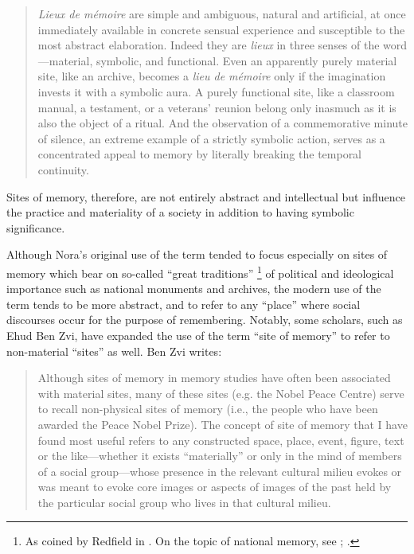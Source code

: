 \begin{quote}
    \emph{Lieux de mémoire} are simple and ambiguous, natural and artificial, at once immediately available in concrete sensual experience and susceptible to the most abstract elaboration. Indeed they are \emph{lieux} in three senses of the word---material, symbolic, and functional. Even an apparently purely material site, like an archive, becomes a \emph{lieu de mémoire} only if the imagination invests it with a symbolic aura. A purely functional site, like a classroom manual, a testament, or a veterans' reunion belong only inasmuch as it is also the object of a ritual. And the observation of a commemorative minute of silence, an extreme example of a strictly symbolic action, serves as a concentrated appeal to memory by literally breaking the temporal continuity.%
        \autocite[18--19]{nora_representations1989}
\end{quote}

\noindent
Sites of memory, therefore, are not entirely abstract and intellectual but influence the practice and materiality of a society in addition to having symbolic significance.

Although Nora's original use of the term tended to focus especially on sites of memory which bear on so-called ``great traditions''%
    \footnote{%
        As coined by Redfield in 
        \cite*[41--42]{redfield1956}.
        On the topic of national memory, see
        \cite{carretero-alphen_wagoner2017};
        \cite{wertsch_wagoner2017}.}
of political and ideological importance such as national monuments and archives, the modern use of the term tends to be more abstract, and to refer to any ``place'' where social discourses occur for the purpose of remembering. Notably, some scholars, such as Ehud Ben Zvi, have expanded the use of the term ``site of memory'' to refer to non-material ``sites'' as well. Ben Zvi writes:

\begin{quote}
    Although sites of memory in memory studies have often been associated with material sites, many of these sites (e.g. the Nobel Peace Centre) serve to recall non-physical sites of memory (i.e., the people who have been awarded the Peace Nobel Prize). The concept of site of memory that I have found most useful refers to any constructed space, place, event, figure, text or the like---whether it exists ``materially'' or only in the mind of members of a social group---whose presence in the relevant cultural milieu evokes or was meant to evoke core images or aspects of images of the past held by the particular social group who lives in that cultural milieu.%
        \autocite{benzvi_st2017}
\end{quote}


